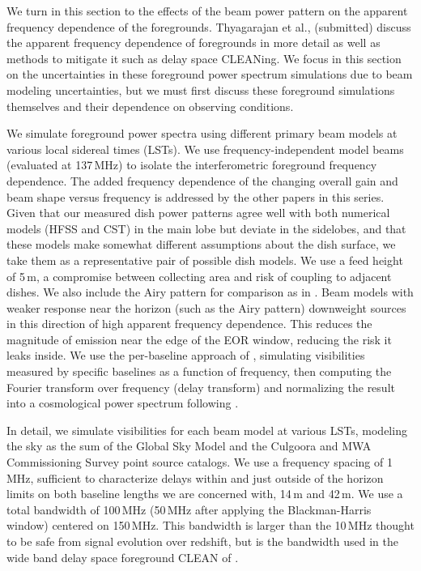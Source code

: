 \documentclass{emulateapj}
\begin{document}
We turn in this section to the effects of the beam power pattern on the apparent frequency dependence of the foregrounds. Thyagarajan et al., (submitted) discuss the apparent frequency dependence of foregrounds in more detail as well as methods to mitigate it such as delay space CLEANing. We focus in this section on the uncertainties in these foreground power spectrum simulations due to beam modeling uncertainties, but we must first discuss these foreground simulations themselves and their dependence on observing conditions. 

We simulate foreground power spectra using different primary beam models at various local sidereal times (LSTs). We use frequency-independent model beams (evaluated at 137\,MHz) to isolate the interferometric foreground frequency dependence. The added frequency dependence of the changing overall gain and beam shape versus frequency is addressed by the other papers in this series. Given that our measured dish power patterns agree well with both numerical models (HFSS and CST) in the main lobe but deviate in the sidelobes, and that these models make somewhat different assumptions about the dish surface, we take them as a representative pair of possible dish models. We use a feed height of 5\,m, a compromise between collecting area and risk of coupling to adjacent dishes. We also include the Airy pattern for comparison as in \citet{nithya15}. Beam models with weaker response near the horizon (such as the Airy pattern) downweight sources in this direction of high apparent frequency dependence. This reduces the magnitude of emission near the edge of the EOR window, reducing the risk it leaks inside. We use the per-baseline approach of \citet{parsons12a,parsons12b}, simulating visibilities measured by specific baselines as a function of frequency, then computing the Fourier transform over frequency (delay transform) and normalizing the result into a cosmological power spectrum following \citet{nithya15}. 

In detail, we simulate visibilities for each beam model at various LSTs, modeling the sky as the sum of the Global Sky Model \citep{gsm} and the Culgoora \citep{Slee1995} and MWA Commissioning Survey \citep{MWACS} point source catalogs. We use a frequency spacing of 1\,MHz, sufficient to characterize delays within and just outside of the horizon limits on both baseline lengths we are concerned with, 14\,m and 42\,m. We use a total bandwidth of 100\,MHz (50\,MHz after applying the Blackman-Harris window) centered on 150\,MHz. This bandwidth is larger than the 10\,MHz thought to be safe from signal evolution over redshift, but is the bandwidth used in the wide band delay space foreground CLEAN of \citet{paper32,paper64}.
\end{document}
